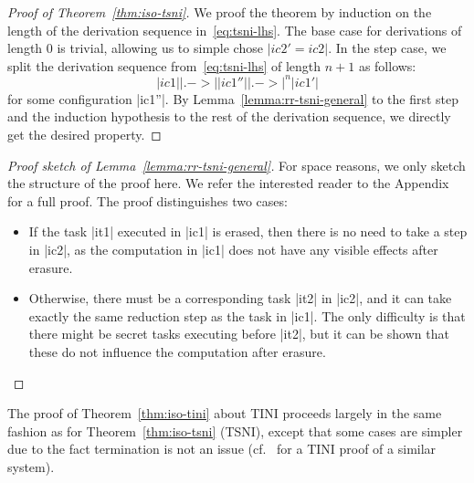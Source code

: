 \begin{proof}[Proof of Theorem~\ref{thm:iso-tsni}]
  We proof the theorem by induction on the length of the derivation sequence in~\eqref{eq:tsni-lhs}.
  The base case for derivations
  of length 0 is trivial, allowing
  us to simple chose $|ic2'=ic2|$.  In the step case,
  we split the derivation sequence from~\eqref{eq:tsni-lhs} of length $n+1$ as follows:
  \[
  |ic1| |.->| |ic1''| |.->|^n |ic1'|
  \]
  for some configuration |ic1''|.  By Lemma~\ref{lemma:rr-tsni-general} to
  the first step and
  the induction hypothesis to the rest of the derivation sequence,
  we directly get the desired property.
\end{proof}
\begin{proof}[Proof sketch of Lemma~\ref{lemma:rr-tsni-general}]
  For space reasons, we only sketch the structure of the proof here.
  We refer the interested reader to the Appendix for a full proof.
  The proof distinguishes two cases:
  \begin{itemize}
    \item If the task |it1| executed in |ic1| is erased, then there is no
    need to take a step in |ic2|, as the computation in |ic1| does
    not have any visible effects after erasure.
    \item Otherwise, there must be a corresponding task |it2| in |ic2|, and
    it can take exactly the same reduction step as the task in |ic1|.
    The only difficulty is that there might be secret tasks executing
    before |it2|, but it can be shown that these do not influence the
    computation after erasure.
  \end{itemize}
\end{proof}
The proof of Theorem~\ref{thm:iso-tini} about TINI proceeds largely
in the same fashion as for Theorem~\ref{thm:iso-tsni} (TSNI), except that
some cases are simpler due to the fact termination is not an issue
(cf.~\cite{lio} for a TINI proof of a similar system).
